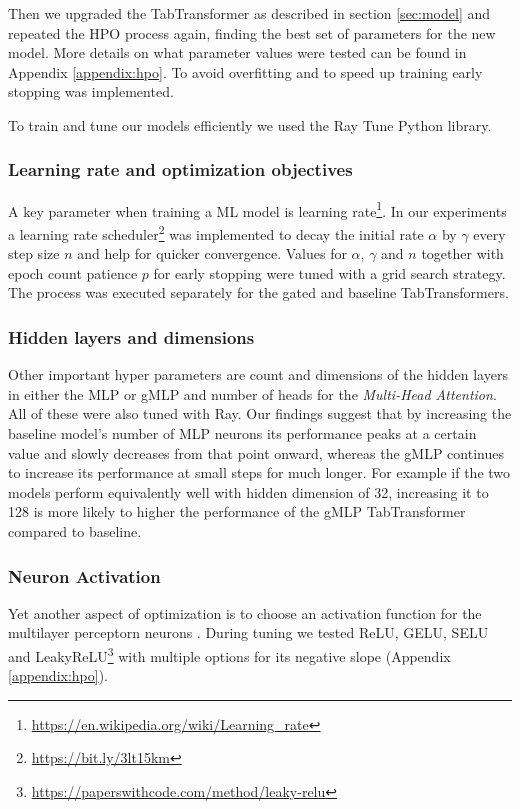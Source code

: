 \documentclass{article}
\begin{document}
Then we upgraded the TabTransformer as described in section \ref{sec:model} and repeated the HPO process again, finding the best set of parameters for the new model. More details on what parameter values were tested can be found in Appendix \ref{appendix:hpo}. To avoid overfitting and to speed up training early stopping was implemented.

To train and tune our models efficiently we used the Ray Tune \cite{liaw2018tune} Python library.

\subsubsection{Learning rate and optimization objectives}

A key parameter when training a ML model is learning rate\footnote{\url{https://en.wikipedia.org/wiki/Learning_rate}}. In our experiments a learning rate scheduler\footnote{\url{https://bit.ly/3lt15km}} was implemented to decay the initial rate $\alpha$ by $\gamma$ every step size $n$ and help for quicker convergence. Values for $\alpha$, $\gamma$ and $n$ together with epoch count patience $p$ for early stopping were tuned with a grid search strategy. The process was executed separately for the gated and baseline TabTransformers.

\subsubsection{Hidden layers and dimensions}

Other important hyper parameters are count and dimensions of the hidden layers in either the MLP or gMLP and number of heads for the \textit{Multi-Head Attention}. All of these were also tuned with Ray. Our findings suggest that by increasing the baseline model's number of MLP neurons its performance peaks at a certain value and slowly decreases from that point onward, whereas the gMLP continues to increase its performance at small steps for much longer. For example if the two models perform equivalently well with hidden dimension of 32, increasing it to 128 is more likely to higher the performance of the gMLP TabTransformer compared to baseline.

\subsubsection{Neuron Activation}

Yet another aspect of optimization is to choose an activation function for the multilayer perceptorn neurons \cite{xu2015empirical}. During tuning we tested ReLU, GELU, SELU and LeakyReLU\footnote{\url{https://paperswithcode.com/method/leaky-relu}} with multiple options for its negative slope (Appendix \ref{appendix:hpo}).
\end{document}
